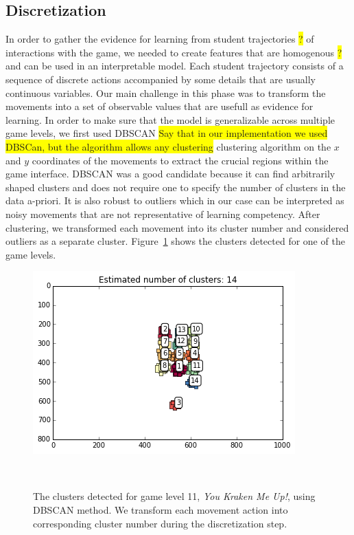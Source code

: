 \documentclass{sigchi}
\newcommand{\hl}[1]{\colorbox{yellow}{#1}}
\begin{document}
\subsection{Discretization}
In order to gather the evidence for learning from student trajectories \hl{?} of interactions with the game, we needed to create features that are homogenous \hl{?} and can be used in an interpretable model. 
Each student trajectory consists of a sequence of discrete actions accompanied by some details that are usually continuous variables. 
Our main challenge in this phase was to transform the movements into a set of observable values that are usefull as evidence for learning.
In order to make sure that the model is generalizable across multiple game levels, we first used DBSCAN \hl{Say that in our implementation we used DBSCan, but the algorithm allows any clustering} clustering algorithm \cite{ester1996density} on the $x$ and $y$ coordinates of the movements to extract the crucial regions within the game interface. 
DBSCAN was a good candidate because it can find arbitrarily shaped clusters and does not require one to specify the number of clusters in the data a-priori. 
It is also robust to outliers which in our case can be interpreted as noisy movements that are not representative of learning competency. 
After clustering, we transformed each movement into its cluster number and considered outliers as a separate cluster. 
Figure~\ref{fig:figurecluster} shows the clusters detected for one of the game levels.

\begin{figure}
	\centering
	\includegraphics[width=0.9\columnwidth]{figures/cluster}
	\caption{The clusters detected for game level 11, \textit {You Kraken Me Up!}, using DBSCAN method. We transform each movement action into corresponding cluster number during the discretization step.}~\label{fig:figurecluster}
\end{figure}
\end{document}
